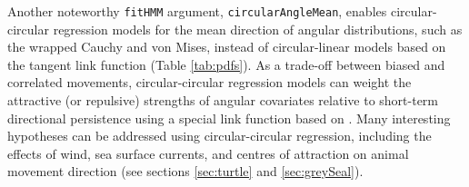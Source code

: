 \documentclass[12pt]{article}\usepackage[]{graphicx}\usepackage[]{color}
\begin{document}
Another noteworthy \verb|fitHMM| argument, \verb|circularAngleMean|, enables circular-circular regression models for the mean direction of angular distributions, such as the wrapped Cauchy and von Mises, instead of circular-linear models based on the tangent link function (Table \ref{tab:pdfs}). %
As a trade-off between biased and correlated movements, circular-circular regression models can weight the attractive (or repulsive) strengths of angular covariates relative to short-term directional persistence using a special link function based on \cite{RivestEtAl2016}. Many interesting hypotheses can be addressed using circular-circular regression, including the effects of wind, sea surface currents, and centres of attraction on animal movement direction (see sections \ref{sec:turtle} and \ref{sec:greySeal}). 
\end{document}
